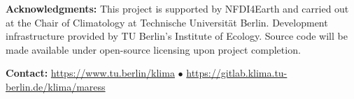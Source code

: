 \documentclass[a0,portrait]{a0poster}
\begin{document}
\vspace{0.5cm}
\begin{center}
	\begin{tcolorbox}[bottombox, width=0.9\textwidth]
		\begin{center}
			\textbf{\large Acknowledgments:} This project is supported by NFDI4Earth and carried out at the Chair of Climatology at Technische Universität Berlin. Development infrastructure provided by TU Berlin's Institute of Ecology. Source code will be made available under open-source licensing upon project completion.

			\vspace{0.3cm}
			\textbf{\large Contact:} \url{https://www.tu.berlin/klima} $\bullet$ \url{https://gitlab.klima.tu-berlin.de/klima/maress}
		\end{center}
	\end{tcolorbox}
\end{center}

\vfill
\end{document}

